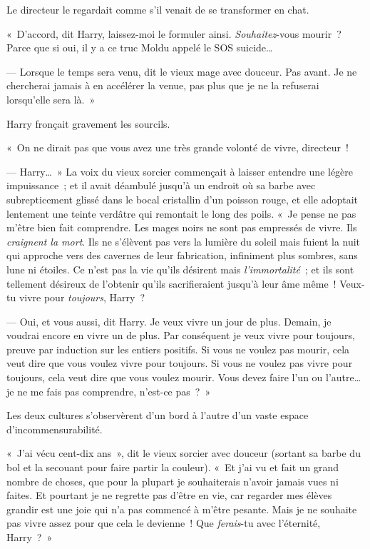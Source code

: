 Le directeur le regardait comme s'il venait de se transformer en chat.

«~D'accord, dit Harry, laissez-moi le formuler ainsi.
\emph{Souhaitez}-vous mourir~?
Parce que si oui, il y a ce truc Moldu appelé le SOS suicide…

--- Lorsque le temps sera venu, dit le vieux mage avec douceur.
Pas avant.
Je ne chercherai jamais à en accélérer la venue, pas plus que je ne la refuserai lorsqu'elle sera là.~»

Harry fronçait gravement les sourcils.

«~On ne dirait pas que vous avez une très grande volonté de vivre, directeur~!

--- Harry…~»
La voix du vieux sorcier commençait à laisser entendre une légère impuissance~; et il avait déambulé jusqu'à un endroit où sa barbe avec subrepticement glissé dans le bocal cristallin d'un poisson rouge, et elle adoptait lentement une teinte verdâtre qui remontait le long des poils.
«~Je pense ne pas m'être bien fait comprendre.
Les mages noirs ne sont pas empressés de vivre.
Ils \emph{craignent la mort}.
Ils ne s'élèvent pas vers la lumière du soleil mais fuient la nuit qui approche vers des cavernes de leur fabrication, infiniment plus sombres, sans lune ni étoiles.
Ce n'est pas la vie qu'ils désirent mais \emph{l'immortalité}~; et ils sont tellement désireux de l'obtenir qu'ils sacrifieraient jusqu'à leur âme même~!
Veux-tu vivre pour \emph{toujours}, Harry~?

--- Oui, et vous aussi, dit Harry.
Je veux vivre un jour de plus.
Demain, je voudrai encore en vivre un de plus.
Par conséquent je veux vivre pour toujours, preuve par induction sur les entiers positifs.
Si vous ne voulez pas mourir, cela veut dire que vous voulez vivre pour toujours.
Si vous ne voulez pas vivre pour toujours, cela veut dire que vous voulez mourir.
Vous devez faire l'un ou l'autre… je ne me fais pas comprendre, n'est-ce pas~?~»

Les deux cultures s'observèrent d'un bord à l'autre d'un vaste espace d'incommensurabilité.

«~J'ai vécu cent-dix ans~», dit le vieux sorcier avec douceur (sortant sa barbe du bol et la secouant pour faire partir la couleur).
«~Et j'ai vu et fait un grand nombre de choses, que pour la plupart je souhaiterais n'avoir jamais vues ni faites.
Et pourtant je ne regrette pas d'être en vie, car regarder mes élèves grandir est une joie qui n'a pas commencé à m'être pesante.
Mais je ne souhaite pas vivre assez pour que cela le devienne~!
Que \emph{ferais}-tu avec l'éternité, Harry~?~»

